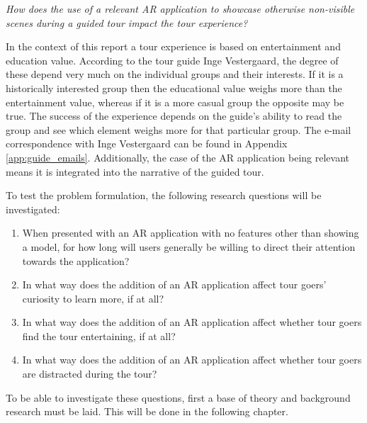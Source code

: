 \begin{displayquote}\textit{How does the use of a relevant AR application to showcase otherwise non-visible scenes during a guided tour impact the tour experience?}\end{displayquote}

In the context of this report a tour experience is based on entertainment and education value. According to the tour guide Inge Vestergaard, the degree of these depend very much on the individual groups and their interests. If it is a historically interested group then the educational value weighs more than the entertainment value, whereas if it is a more casual group the opposite may be true. The success of the experience depends on the guide’s ability to read the group and see which element weighs more for that particular group. The e-mail correspondence with Inge Vestergaard can be found in Appendix \ref{app:guide_emails}. Additionally, the case of the AR application being relevant means it is integrated into the narrative of the guided tour.

To test the problem formulation, the following research questions will be investigated: 

\begin{enumerate}
\item When presented with an AR application with no features other than showing a model, for how long will users generally be willing to direct their attention towards the application?
\item In what way does the addition of an AR application affect tour goers’ curiosity to learn more, if at all?
\item In what way does the addition of an AR application affect whether tour goers find the tour entertaining, if at all?
\item In what way does the addition of an AR application affect whether tour goers are distracted during the tour?
\end{enumerate}

To be able to investigate these questions, first a base of theory and background research must be laid. This will be done in the following chapter. 